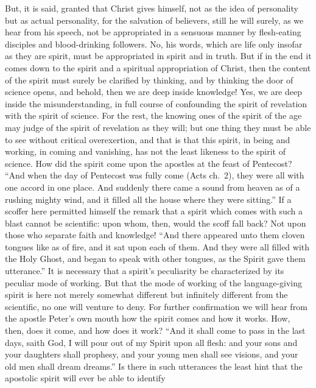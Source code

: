 \documentclass[12pt]{book}
\newcommand{\opage}[1]{\marginnote{\footnotesize\textit{[#1]}}}
\begin{document}
But, it is said, granted that Christ gives himself, not as the idea of
personality but as actual personality, for the salvation of believers,
still he will surely,
\opage{76}\setcounter{footnote}{0}%
as we hear from his speech, not be appropriated in a sensuous manner by
flesh-eating disciples and blood-drinking followers. No, his words,
which are life only insofar as they are spirit, must be appropriated in
spirit and in truth. But if in the end it comes down to the spirit and a
spiritual appropriation of Christ, then the content of the spirit must
surely be clarified by thinking, and by thinking the door of science
opens, and behold, then we are deep inside knowledge! Yes, we are deep
inside the misunderstanding, in full course of confounding the spirit of
revelation with the spirit of science. For the rest, the knowing ones of
the spirit of the age may judge of the spirit of revelation as they
will; but one thing they must be able to see without critical
overexertion, and that is that this spirit, in being and working, in
coming and vanishing, has not the least likeness to the spirit of
science. How did the spirit come upon the apostles at the feast of
Pentecost? ``And when the day of Pentecost was fully come (Acts ch.~2),
they were all with one accord in one place. And suddenly there came a
sound from heaven as of a rushing mighty wind, and it filled all the
house where they were sitting.'' If a scoffer here permitted himself the
remark that a spirit which comes with such a blast cannot be scientific:
upon whom, then, would the scoff fall back? Not upon those who separate
faith and knowledge! ``And there appeared unto them cloven tongues like
as of fire, and it sat upon each of them. And they were all filled with
the Holy Ghost, and began to speak with other tongues, as the Spirit
gave them utterance.'' It is necessary that a spirit's peculiarity be
characterized by its peculiar mode of working. But that the mode of
working of the language-giving spirit is here not merely somewhat
different but infinitely different from the scientific, no one will
venture to deny. For further confirmation we will hear from the apostle
Peter's own
\opage{77}\setcounter{footnote}{0}%
mouth how the spirit comes and how it works. How, then, does it come,
and how does it work? ``And it shall come to pass in the last days,
saith God, I will pour out of my Spirit upon all flesh: and your sons
and your daughters shall prophesy, and your young men shall see visions,
and your old men shall dream dreams.'' Is there in such utterances the
least hint that the apostolic spirit will ever be able to identify
\end{document}

